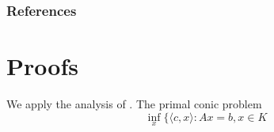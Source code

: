 \documentclass[twoside]{article}
\begin{document}
\subsubsection*{References}
\printbibliography


\clearpage
\onecolumn
\appendix
\section{Proofs}

\begin{lproof}\label{proof:main}
    We apply the analysis of \textcite{badenbroek2021algorithm}.
    The primal conic problem
    \[
        \inf_{x} \{\langle c, x\rangle : Ax = b, x \in K \tag{D}
    \]

\end{lproof}

\subsection{}
\end{document}
